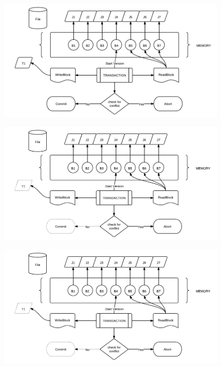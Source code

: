 \documentclass[11pt,a4paper]{article}
\begin{document}
\begin{figure}[htb]
\centering
\includegraphics[angle=90]{1}
\end{figure}

\begin{figure}[htb]
\centering
\includegraphics[angle=90]{2}
\end{figure}

\begin{figure}[htb]
\centering
\includegraphics[angle=90]{2}
\end{figure}
\end{document}
